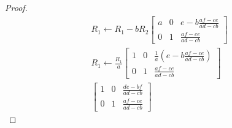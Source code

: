 \documentclass[11pt]{scrartcl}
\begin{document}
\begin{enumerate}[label=\alph*.]
{\begin{proof}
\begin{align*}
			      R_1 \leftarrow R_1 - bR_2
			      \left[\begin{array}{cc|c}
					      a & 0 & e -b \frac{af-ce}{ad-cb} \\
					      0 & 1 & \frac{af-ce}{ad-cb}
				      \end{array}\right] \\
			      R_1 \leftarrow \frac{R_1}{a}
			      \left[\begin{array}{cc|c}
					      1 & 0 & \frac{1}{a}(e -b \frac{af-ce}{ad-cb}) \\
					      0 & 1 & \frac{af-ce}{ad-cb}
				      \end{array}\right] \\
			      \left[\begin{array}{cc|c}
					      1 & 0 & \frac{de-bf}{ad-cb} \\
					      0 & 1 & \frac{af-ce}{ad-cb}
				      \end{array}\right]
		      \end{align*}


\end{proof}}
\end{enumerate}
\end{document}

